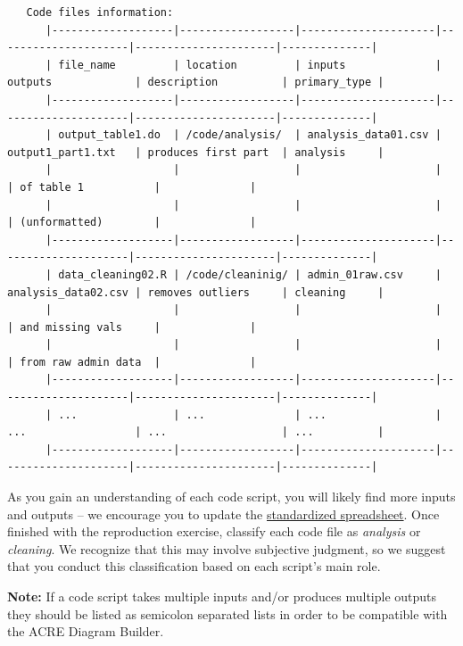 \documentclass[]{book}
\begin{document}
\begin{verbatim}
   Code files information:
      |-------------------|------------------|---------------------|---------------------|----------------------|--------------|
      | file_name         | location         | inputs              | outputs             | description          | primary_type |
      |-------------------|------------------|---------------------|---------------------|----------------------|--------------|
      | output_table1.do  | /code/analysis/  | analysis_data01.csv | output1_part1.txt   | produces first part  | analysis     |
      |                   |                  |                     |                     | of table 1           |              |
      |                   |                  |                     |                     | (unformatted)        |              |
      |-------------------|------------------|---------------------|---------------------|----------------------|--------------|
      | data_cleaning02.R | /code/cleaninig/ | admin_01raw.csv     | analysis_data02.csv | removes outliers     | cleaning     |
      |                   |                  |                     |                     | and missing vals     |              |
      |                   |                  |                     |                     | from raw admin data  |              |
      |-------------------|------------------|---------------------|---------------------|----------------------|--------------|
      | ...               | ...              | ...                 | ...                 | ...                  | ...          |
      |-------------------|------------------|---------------------|---------------------|----------------------|--------------|
\end{verbatim}

As you gain an understanding of each code script, you will likely find more inputs and outputs -- we encourage you to update the \href{https://docs.google.com/spreadsheets/d/1LUIdVFH0OfR70C7z07TYeE-uWzKI_JIeWUMaYhqEKK0/edit\#gid=1617799822\&range=A1}{standardized spreadsheet}. Once finished with the reproduction exercise, classify each code file as \emph{analysis} or \emph{cleaning}. We recognize that this may involve subjective judgment, so we suggest that you conduct this classification based on each script's main role.

\textbf{Note:} If a code script takes multiple inputs and/or produces multiple outputs they should be listed as semicolon separated lists in order to be compatible with the ACRE Diagram Builder.
\end{document}
